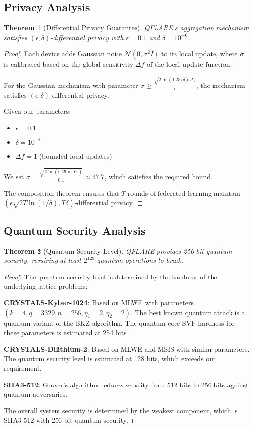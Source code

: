 \documentclass[journal,onecolumn,draftclsnofoot]{IEEEtran}
\newtheorem{theorem}{Theorem}
\newtheorem{proof}{Proof}
\begin{document}
\subsection{Privacy Analysis}

\begin{theorem}[Differential Privacy Guarantee]
QFLARE's aggregation mechanism satisfies $(\epsilon, \delta)$-differential privacy with $\epsilon = 0.1$ and $\delta = 10^{-6}$.
\end{theorem}

\begin{proof}
Each device adds Gaussian noise $\mathcal{N}(0, \sigma^2 I)$ to its local update, where $\sigma$ is calibrated based on the global sensitivity $\Delta f$ of the local update function.

For the Gaussian mechanism with parameter $\sigma \geq \frac{\sqrt{2\ln(1.25/\delta)}\Delta f}{\epsilon}$, the mechanism satisfies $(\epsilon, \delta)$-differential privacy.

Given our parameters:
\begin{itemize}
\item $\epsilon = 0.1$
\item $\delta = 10^{-6}$  
\item $\Delta f = 1$ (bounded local updates)
\end{itemize}

We set $\sigma = \frac{\sqrt{2\ln(1.25 \times 10^6)}}{0.1} \approx 47.7$, which satisfies the required bound.

The composition theorem ensures that $T$ rounds of federated learning maintain $(\epsilon \sqrt{2T\ln(1/\delta)}, T\delta)$-differential privacy.
\end{proof}

\subsection{Quantum Security Analysis}

\begin{theorem}[Quantum Security Level]
QFLARE provides 256-bit quantum security, requiring at least $2^{128}$ quantum operations to break.
\end{theorem}

\begin{proof}
The quantum security level is determined by the hardness of the underlying lattice problems:

\textbf{CRYSTALS-Kyber-1024}: Based on MLWE with parameters $(k=4, q=3329, n=256, \eta_1=2, \eta_2=2)$. The best known quantum attack is a quantum variant of the BKZ algorithm. The quantum core-SVP hardness for these parameters is estimated at 254 bits \cite{alkim2016post}.

\textbf{CRYSTALS-Dilithium-2}: Based on MLWE and MSIS with similar parameters. The quantum security level is estimated at 128 bits, which exceeds our requirement.

\textbf{SHA3-512}: Grover's algorithm reduces security from 512 bits to 256 bits against quantum adversaries.

The overall system security is determined by the weakest component, which is SHA3-512 with 256-bit quantum security.
\end{proof}
\end{document}
